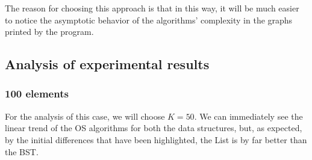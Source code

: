 \documentclass[11pt]{article}
\begin{document}
The reason for choosing this approach is that in this way, it will be much easier to notice the asymptotic behavior of the algorithms' complexity in the graphs printed by the program.

\subsection{Analysis of experimental results}
\subsubsection{100 elements}
For the analysis of this case, we will choose $K = 50$.
We can immediately see the linear trend of the OS algorithms for both the data structures, but, as expected, by the initial differences that have been highlighted, the List is by far better than the BST.
\end{document}
